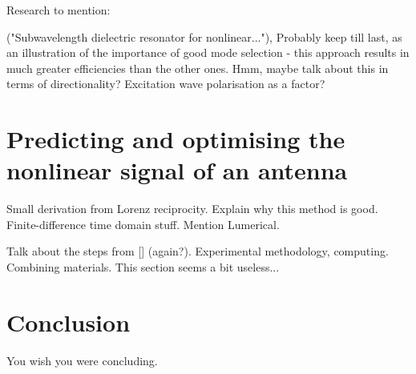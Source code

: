 \documentclass[12pt,a4paper]{article}
\newcommand{\citein}[1]{[\citen{#1}]}
\begin{document}
Research to mention:

\cite{koshelevSubwavelengthDielectricResonators2020} ("Subwavelength dielectric resonator for nonlinear..."),
Probably keep till last, as an illustration of the importance of good mode selection - this approach results in much greater efficiencies than the other ones. Hmm, maybe talk about this in terms of directionality? Excitation wave polarisation as a factor?

\section{Predicting and optimising the nonlinear signal of an antenna}
Small derivation from Lorenz reciprocity. Explain why this method is good. Finite-difference time domain stuff. Mention Lumerical.

Talk about the steps from \citein{koshelevSubwavelengthDielectricResonators2020} (again?). Experimental methodology, computing. Combining materials. This section seems a bit useless...

\section{Conclusion}
You wish you were concluding\cite{aluTheoryModelingFeatures2013}.



\end{document}
